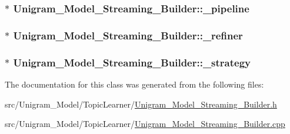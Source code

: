 \hypertarget{class_unigram___model___streaming___builder_a92fea933c39e4671079e895ff3d1911e}{
\subsubsection[{\_\-pipeline}]{$\ast$ {\bf Unigram\_\-Model\_\-Streaming\_\-Builder::\_\-pipeline}}}
\label{class_unigram___model___streaming___builder_a92fea933c39e4671079e895ff3d1911e}
\hypertarget{class_unigram___model___streaming___builder_a8ecadb0794c19faa329ec649c3971af7}{
\subsubsection[{\_\-refiner}]{$\ast$ {\bf Unigram\_\-Model\_\-Streaming\_\-Builder::\_\-refiner}}}
\label{class_unigram___model___streaming___builder_a8ecadb0794c19faa329ec649c3971af7}
\hypertarget{class_unigram___model___streaming___builder_af5e8797481308aca8fc2b1528fa0fde7}{
\subsubsection[{\_\-strategy}]{$\ast$ {\bf Unigram\_\-Model\_\-Streaming\_\-Builder::\_\-strategy}}}
\label{class_unigram___model___streaming___builder_af5e8797481308aca8fc2b1528fa0fde7}


The documentation for this class was generated from the following files:\begin{DoxyCompactItemize}
\item 
src/Unigram\_\-Model/TopicLearner/\hyperlink{_unigram___model___streaming___builder_8h}{Unigram\_\-Model\_\-Streaming\_\-Builder.h}\item 
src/Unigram\_\-Model/TopicLearner/\hyperlink{_unigram___model___streaming___builder_8cpp}{Unigram\_\-Model\_\-Streaming\_\-Builder.cpp}\end{DoxyCompactItemize}
